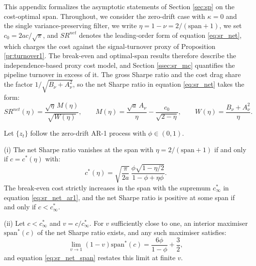 \documentclass[hidelinks]{siamonline250211}
\newcommand{\spn}{\mathrm{span}}
\begin{document}
This appendix formalizes the asymptotic statements of Section \ref{sec:sp} on the cost-optimal span. Throughout, we consider the zero-drift case with $\kappa=0$ and the single variance-preserving filter, we write $\eta = 1-\nu = 2/(\spn+1)$, we set $c_{0}=2ac/\sqrt{\pi}$, and $SR^{net}$ denotes the leading-order form of equation \eqref{eq:sr_net}, which charges the cost against the signal-turnover proxy of Proposition \ref{pr:turnover1}. The break-even and optimal-span results therefore describe the independence-based proxy cost model, and Section \ref{ssec:sr_mc} quantifies the pipeline turnover in excess of it. The gross Sharpe ratio and the cost drag share the factor $1/\sqrt{B_{\nu}+A^{2}_{\nu}}$, so the net Sharpe ratio in equation \eqref{eq:sr_net} takes the form:
\begin{equation}\label{eq:asym1}
	SR^{net}(\eta) = \frac{\sqrt{\eta}\, M(\eta)}{\sqrt{W(\eta)}}, \qquad
	M(\eta) = \frac{\sqrt{a}\,A_{\nu}}{\eta} - \frac{c_{0}}{\sqrt{2-\eta}}, \qquad
	W(\eta) = \frac{B_{\nu} + A^{2}_{\nu}}{\eta}.
\end{equation}

\begin{proposition}\label{pr:asym_ar1}
	Let $\{z_{t}\}$ follow the zero-drift AR-1 process with $\phi \in (0,1)$.
	
	(i) The net Sharpe ratio vanishes at the span with $\eta = 2/(\spn+1)$ if and only if $c = c^{*}(\eta)$ with:
	\begin{equation}\label{eq:asym2}
		c^{*}(\eta) = \sqrt{\frac{\pi}{2a}}\, \frac{\phi\sqrt{1-\eta/2}}{1-\phi+\eta\phi}.
	\end{equation}
	The break-even cost strictly increases in the span with the supremum $c^{*}_{\infty}$ in equation \eqref{eq:sr_net_ar1}, and the net Sharpe ratio is positive at some span if and only if $c < c^{*}_{\infty}$.
	
	(ii) Let $c < c^{*}_{\infty}$ and $v = c/c^{*}_{\infty}$. For $v$ sufficiently close to one, an interior maximiser $\spn^{*}(c)$ of the net Sharpe ratio exists, and any such maximiser satisfies:
	\begin{equation}\label{eq:asym3}
		\lim_{v \to 1} \left( 1 - v \right) \spn^{*}(c) = \frac{6\phi}{1-\phi} + \frac{3}{2},
	\end{equation}
	and equation \eqref{eq:sr_net_span} restates this limit at finite $v$.
\end{proposition}
\end{document}
